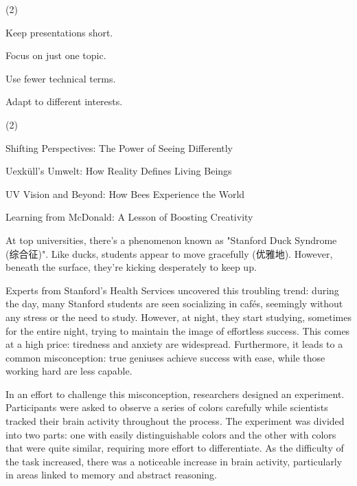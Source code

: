 \documentclass{英语试卷}
\begin{document}
\begin{choices}(2)
  \item Keep presentations short.
  \item Focus on just one topic.
  \item Use fewer technical terms.
  \item Adapt to different interests.
\end{choices}
\begin{choices}(2)
  \item Shifting Perspectives: The Power of Seeing Differently
  \item Uexküll's Umwelt: How Reality Defines Living Beings
  \item UV Vision and Beyond: How Bees Experience the World
  \item Learning from McDonald: A Lesson of Boosting Creativity
\end{choices}
\par At top universities, there's a phenomenon known as "Stanford Duck Syndrome (综合征)". Like ducks, students appear to move gracefully (优雅地). However, beneath the surface, they're kicking desperately to keep up.\par
\par Experts from Stanford's Health Services uncovered this troubling trend: during the day, many Stanford students are seen socializing in cafés, seemingly without any stress or the need to study. However, at night, they start studying, sometimes for the entire night, trying to maintain the image of effortless success. This comes at a high price: tiredness and anxiety are widespread. Furthermore, it leads to a common misconception: true geniuses achieve success with ease, while those working hard are less capable.\par
\par In an effort to challenge this misconception, researchers designed an experiment. Participants were asked to observe a series of colors carefully while scientists tracked their brain activity throughout the process. The experiment was divided into two parts: one with easily distinguishable colors and the other with colors that were quite similar, requiring more effort to differentiate. As the difficulty of the task increased, there was a noticeable increase in brain activity, particularly in areas linked to memory and abstract reasoning.\par
\end{document}

